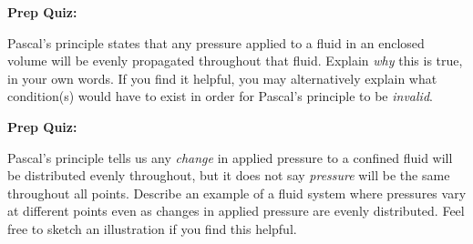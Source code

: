 \vfil \eject

\noindent
{\bf Prep Quiz:}

Pascal's principle states that any pressure applied to a fluid in an enclosed volume will be evenly propagated throughout that fluid.  Explain {\it why} this is true, in your own words.  If you find it helpful, you may alternatively explain what condition(s) would have to exist in order for Pascal's principle to be {\it invalid}.





\vfil \eject

\noindent
{\bf Prep Quiz:}

Pascal's principle tells us any {\it change} in applied pressure to a confined fluid will be distributed evenly throughout, but it does not say {\it pressure} will be the same throughout all points.  Describe an example of a fluid system where pressures vary at different points even as changes in applied pressure are evenly distributed.  Feel free to sketch an illustration if you find this helpful.






